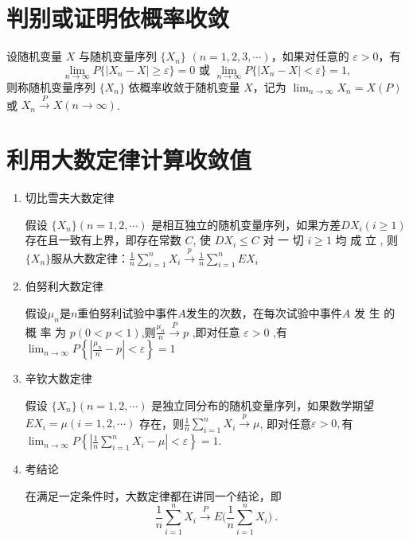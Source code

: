 
\section{判别或证明依概率收敛}
设随机变量 $X$ 与随机变量序列 $\{X_n\}$ $(n=1,2,3,\cdots)$，如果对任意的 $\varepsilon > 0$，有
$$\lim_{n\to\infty}P\{|X_n-X|\geqslant\varepsilon\}=0 \text{ 或 } \lim_{n\to\infty}P\{|X_n-X|<\varepsilon\}=1,$$
则称随机变量序列 $\{X_n\}$ 依概率收敛于随机变量 $X$，记为 $\lim_{n\to\infty}X_n=X(P)$ 或 $X_n\xrightarrow{P}X(n\to\infty)$.

\section{利用大数定律计算收敛值}
\begin{enumerate}
      \item 切比雪夫大数定律

            假设 $\{X_{n}\}(n=1,2,\cdots)$ 是相互独立的随机变量序列，如果方差$DX_i(i\geqslant1)$存在且一致有上界，即存在常数 $C$, 使 $DX_i\leq C$ 对 一 切  $i\geqslant 1$ 均 成 立 , 则  $\{ X_n\}$服从大数定律：$\frac1n\sum_{i=1}^{n}X_i\xrightarrow{p}\frac1n\sum_{i=1}^{n}EX_i$
      \item 伯努利大数定律

            假设$\mu_n$是$n$重伯努利试验中事件$A$发生的次数，在每次试验中事件$A$ 发 生 的 概 率 为 $p( 0< p< 1)$,则$\frac{\mu_n}n\xrightarrow{P}p$ ,即对任意 $\varepsilon>0$ ,有$\lim_{n\to\infty} P\left\{\left|\frac{\mu_n}{n}-p\right|<\varepsilon\right\}=1$
      \item 辛钦大数定律

            假设 $\{X_{n}\} (n=1,2,\cdots)$ 是独立同分布的随机变量序列，如果数学期望 $EX_{i}=\mu (i=1,2,\cdots)$ 存在，则$\frac{1}{n}\sum_{i=1}^{n}X_{i} \xrightarrow{p} \mu $, 即对任意$ \varepsilon > 0, $有$ \lim_{n \to \infty} P\left\{\left|\frac{1}{n}\sum_{i=1}^{n}X_{i} - \mu\right| < \varepsilon\right\} = 1 $.
      \item 考结论

            在满足一定条件时，大数定律都在讲同一个结论，即
            $$\frac{1}{n}\sum_{i=1}^{n}X_{i}\xrightarrow{P}E\biggl(\frac{1}{n}\sum_{i=1}^{n}X_{i}\biggr)\:.$$
\end{enumerate}


